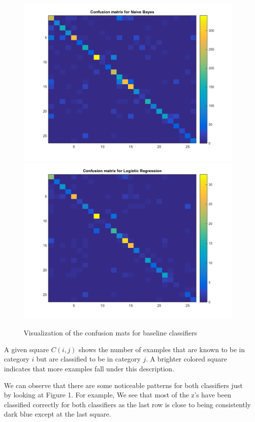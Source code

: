 \documentclass{article} %
\begin{document}
\begin{figure}[h]
\begin{center}
\includegraphics[scale=0.3]{confusionnb.png}
\includegraphics[scale=0.3]{confusionlr.png}
\end{center}
\caption{Visualization of the confusion mats for baseline classifiers}
\end{figure}

A given square $C(i, j)$ shows the number of examples that are known to be in category $i$ but are classified to be in category $j$. A brighter colored square indicates that more examples fall under this description.

We can observe that there are some noticeable patterns for both classifiers just by looking at Figure 1. For example, We see that most of the z's have been classified correctly for both classifiers as the last row is close to being consistently dark blue except at the last square.
\end{document}
